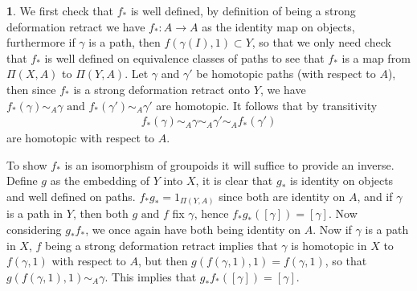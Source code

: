 \documentclass[10.5pt]{article}
\theoremstyle{definition}
\newtheorem{pb}{}
\newcommand{\tand}{\text{ and }}
\begin{document}
    \begin{pb}
        We first check that \(f_*\) is well defined, by definition of being a strong deformation retract we have \(f_*: A \to A\) as the identity map on objects, furthermore if \(\gamma\) is a path, then
        \(f(\gamma(I),1)\subset Y\), so that we only need check that \(f_*\) is well defined on equivalence classes of paths to see that \(f_*\) is a map from \(\Pi(X,A)\) to \(\Pi(Y,A)\).
        Let \(\gamma\) and \(\gamma'\) be homotopic paths (with respect to \(A\)), then since \(f_*\) is a strong deformation retract onto \(Y\), we have
        \(f_*(\gamma) \sim_A \gamma \tand f_*(\gamma') \sim_A \gamma'\) are homotopic. It follows that by transitivity
        \begin{align*}
            f_*(\gamma) \sim_A \gamma \sim_A \gamma' \sim_A f_*(\gamma')
        \end{align*}
        are homotopic with respect to \(A\).

        To show \(f_*\) is an isomorphism of groupoids it will suffice to provide an inverse. Define \(g\) as the embedding of \(Y\) into \(X\), it is clear that \(g_*\) is identity on objects and
        well defined on paths. \(f_*g_* = 1_{\Pi(Y,A)}\) since both are identity on \(A\), and if \(\gamma\) is a path in \(Y\), then both \(g \tand f\) fix \(\gamma\), hence
        \(f_*g_*([\gamma]) = [\gamma]\). Now considering \(g_*f_*\), we once again have both being identity on \(A\). Now if \(\gamma\) is a path in \(X\), \(f\) being a strong
        deformation retract implies that \(\gamma\) is homotopic in \(X\) to \(f(\gamma,1)\) with respect to \(A\), but then \(g(f(\gamma,1),1) = f(\gamma,1)\), so that
        \(g(f(\gamma,1),1) \sim_A \gamma\). This implies that \(g_*f_*([\gamma]) = [\gamma]\).
    \end{pb}
\end{document}
